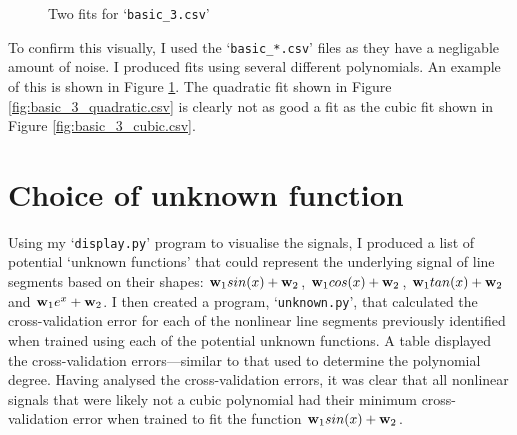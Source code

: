 \documentclass[onecolumn, 12pt, a4paper]{article}
\begin{document}
\begin{figure}[htbp]
    \centering
    \hfill
    \caption{Two fits for `\texttt{basic\_3.csv}'}
    \label{fig:basic_3.csv}
\end{figure}

To confirm this visually, I used the `\texttt{basic\_*.csv}' files
as they have a negligable amount of noise.
I produced fits using several different polynomials.
An example of this is shown in Figure \ref{fig:basic_3.csv}.
The quadratic fit shown in Figure \ref{fig:basic_3_quadratic.csv}
is clearly not as good a fit as the cubic fit shown in Figure \ref{fig:basic_3_cubic.csv}.

\section{Choice of unknown function}

Using my `\texttt{display.py}' program to visualise the
signals, I produced a list of potential `unknown functions'
that could represent the underlying signal of line segments
based on their shapes:
$\vb{w}_{1}sin(x) + \vb{w}_{2}$,
$\vb{w}_{1}cos(x) + \vb{w}_{2}$,
$\vb{w}_{1}tan(x) + \vb{w}_{2}$ and
$\vb{w}_{1}e^{x} + \vb{w}_{2}$.
I then created a program, `\texttt{unknown.py}', that
calculated the cross-validation error for each of the
nonlinear line segments previously identified when
trained using each of the potential unknown functions.
A table displayed the cross-validation errors---similar 
to that used to determine the polynomial degree.
Having analysed the cross-validation errors, it was clear
that all nonlinear signals that were likely not
a cubic polynomial had their minimum cross-validation
error when trained to fit the function
$\vb{w}_{1}sin(x) + \vb{w}_{2}$.
\end{document}
